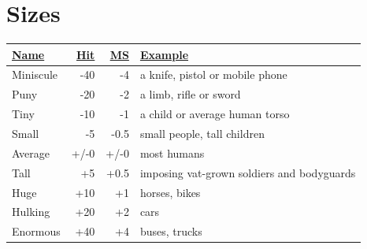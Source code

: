 \section{Sizes}
\label{sizestable}
\begin{tabularx}{\columnwidth}{|l|r|r|X|}
	\hline
	\ul{Name} & \ul{Hit} & \ul{MS} & \ul{Example} \\ \hline
	Miniscule & -40 & -4 & a knife, pistol or mobile phone \\ \hline
	Puny & -20 & -2 & a limb, rifle or sword \\ \hline
	Tiny & -10 & -1 & a child or average human torso \\ \hline
	Small & -5 & -0.5 & small people, tall children \\ \hline
	Average & +/-0 & +/-0 & most humans \\ \hline
	Tall & +5 & +0.5 & imposing vat-grown soldiers and bodyguards \\ \hline
	Huge & +10 & +1 & horses, bikes \\ \hline
	Hulking & +20 & +2 & cars \\ \hline
	Enormous & +40 & +4 & buses, trucks \\ \hline
\end{tabularx}
